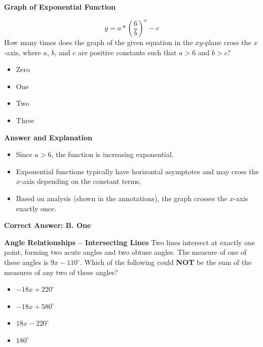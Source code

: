\documentclass{beamer}
\begin{document}
\begin{frame}{\textbf{Graph of Exponential Function}}

\[
y = a * (\frac{6}{b})^{x}-c

\]
How many times does the graph of the given equation in the \(xy\)-plane cross the \(x\)-axis, where \(a\), \(b\), and \(c\) are positive constants such that \(a > 6\) and \(b > c\)?

\begin{itemize}
    \item[A.] Zero
    \item[B.] One
    \item[C.] Two
    \item[D.] Three
\end{itemize}
\end{frame}

\begin{frame}{\textbf{Answer and Explanation}}
\begin{itemize}
    \item Since \(a > 6\), the function is increasing exponential.
    \item Exponential functions typically have horizontal asymptotes and may cross the \(x\)-axis depending on the constant terms.
    \item Based on analysis (shown in the annotations), the graph crosses the \(x\)-axis exactly once.
\end{itemize}

\textbf{Correct Answer: B. One}
\end{frame}



\begin{frame}{\textbf{Angle Relationships – Intersecting Lines}}
Two lines intersect at exactly one point, forming two acute angles and two obtuse angles. The measure of one of these angles is \(9x - 110^\circ\). Which of the following could \textbf{NOT} be the sum of the measures of any two of these angles?

\begin{itemize}
    \item[A.] \(-18x + 220^\circ\)
    \item[B.] \(-18x + 580^\circ\)
    \item[C.] \(18x - 220^\circ\)
    \item[D.] \(180^\circ\)
\end{itemize}
\end{frame}
\end{document}
